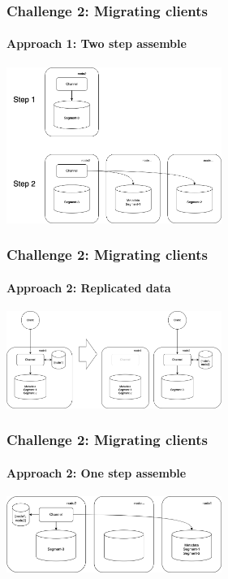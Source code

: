 \documentclass{beamer}
\begin{document}
\begin{frame}
    \frametitle{Challenge 2: Migrating clients}
    \framesubtitle{Approach 1: Two step assemble}

    \begin{center}
        \includegraphics[width=7cm, keepaspectratio]{images/assemble-1.png}
    \end{center}
\end{frame}

\begin{frame}
    \frametitle{Challenge 2: Migrating clients}
    \framesubtitle{Approach 2: Replicated data}

    \begin{center}
        \includegraphics[width=7cm, keepaspectratio]{images/replicated-data.png}
    \end{center}
\end{frame}

\begin{frame}
    \frametitle{Challenge 2: Migrating clients}
    \framesubtitle{Approach 2: One step assemble}

    \begin{center}
        \includegraphics[width=7cm, keepaspectratio]{images/assemble-2.png}
    \end{center}
\end{frame}
\end{document}
